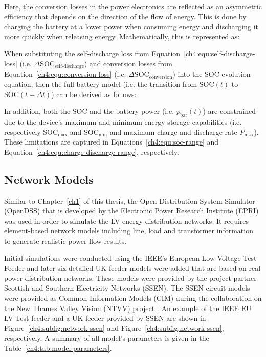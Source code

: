 

Here, the conversion losses in the power electronics are reflected as an asymmetric efficiency that depends on the direction of the flow of energy.
This is done by charging the battery at a lower power when consuming energy and discharging it more quickly when releasing energy.
Mathematically, this is represented as:



When substituting the self-discharge loss from Equation~\ref{ch4:equ:self-discharge-loss} (i.e. $\Delta\text{SOC}_\text{self-discharge}$) and conversion losses from Equation~\ref{ch4:equ:conversion-loss} (i.e. $\Delta\text{SOC}_\text{conversion}$) into the SOC evolution equation, then the full battery model (i.e. the transition from $\text{SOC}(t)$ to $\text{SOC}(t+\Delta t)$) can be derived as follows:



In addition, both the SOC and the battery power (i.e. $p_\text{bat}(t)$) are constrained due to the device's maximum and minimum energy storage capabilities (i.e. respectively $\text{SOC}_\text{max}$ and $\text{SOC}_\text{min}$ and maximum charge and discharge rate $P_\text{max}$).
These limitations are captured in Equations~\ref{ch4:equ:soc-range} and Equation~\ref{ch4:equ:charge-discharge-range}, respectively.





\subsection{Network Models}
\label{ch4:subsec:network-models}

Similar to Chapter~\ref{ch1} of this thesis, the Open Distribution System Simulator (OpenDSS) that is developed by the Electronic Power Research Institute (EPRI) was used in order to simulate the LV energy distribution networks.
It requires element-based network models including line, load and transformer information to generate realistic power flow results.



Initial simulations were conducted using the IEEE's European Low Voltage Test Feeder \cite{EULVFeeder2015} and later six detailed UK feeder models were added that are based on real power distribution networks.
These models were provided by the project partner Scottish and Southern Electricity Networks (SSEN).
The SSEN circuit models were provided as Common Information Models (CIM) during the collaboration on the New Thames Valley Vision (NTVV) project \cite{NTVV2016}.
An example of the IEEE EU LV Test feeder and a UK feeder provided by SSEN are shown in Figure~\ref{ch4:subfig:network-ssen} and Figure~\ref{ch4:subfig:network-ssen}, respectively.
A summary of all model's parameters is given in the Table~\ref{ch4:tab:model-parameters}.

